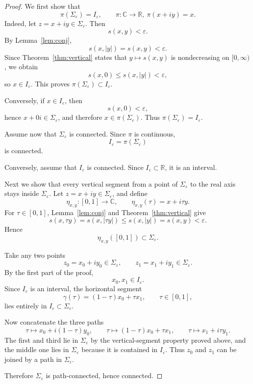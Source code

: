 \documentclass[11pt]{article}
\numberwithin{equation}{section}
\begin{document}
\begin{proof}
We first show that
\[
\pi(\Sigma_\varepsilon)=I_\varepsilon,
\qquad
\pi:\mathbb C\to\mathbb R,\ \pi(x+iy)=x.
\]
Indeed, let \(z=x+iy\in\Sigma_\varepsilon\).  Then
\[
s(x,y)<\varepsilon.
\]
By Lemma~\ref{lem:conj},
\[
s(x,|y|)=s(x,y)<\varepsilon.
\]
Since Theorem~\ref{thm:vertical} states that \(y\mapsto s(x,y)\) is nondecreasing on
\([0,\infty)\), we obtain
\[
s(x,0)\le s(x,|y|)<\varepsilon,
\]
so \(x\in I_\varepsilon\).  This proves \(\pi(\Sigma_\varepsilon)\subset I_\varepsilon\).

Conversely, if \(x\in I_\varepsilon\), then
\[
s(x,0)<\varepsilon,
\]
hence \(x+0i\in\Sigma_\varepsilon\), and therefore \(x\in\pi(\Sigma_\varepsilon)\).
Thus \(\pi(\Sigma_\varepsilon)=I_\varepsilon\).

Assume now that \(\Sigma_\varepsilon\) is connected.  Since \(\pi\) is continuous,
\[
I_\varepsilon=\pi(\Sigma_\varepsilon)
\]
is connected.

Conversely, assume that \(I_\varepsilon\) is connected.  Since \(I_\varepsilon\subset\mathbb R\),
it is an interval.

Next we show that every vertical segment from a point of \(\Sigma_\varepsilon\) to the
real axis stays inside \(\Sigma_\varepsilon\).  Let \(z=x+iy\in\Sigma_\varepsilon\), and define
\[
\eta_{x,y}:[0,1]\to\mathbb C,
\qquad
\eta_{x,y}(\tau)=x+i\tau y.
\]
For \(\tau\in[0,1]\), Lemma~\ref{lem:conj} and Theorem~\ref{thm:vertical} give
\[
s(x,\tau y)=s(x,|\tau y|)
\le s(x,|y|)
= s(x,y)
<\varepsilon.
\]
Hence
\[
\eta_{x,y}([0,1])\subset\Sigma_\varepsilon.
\]

Take any two points
\[
z_0=x_0+iy_0\in\Sigma_\varepsilon,
\qquad
z_1=x_1+iy_1\in\Sigma_\varepsilon.
\]
By the first part of the proof,
\[
x_0,x_1\in I_\varepsilon.
\]
Since \(I_\varepsilon\) is an interval, the horizontal segment
\[
\gamma(\tau)=(1-\tau)x_0+\tau x_1,
\qquad
\tau\in[0,1],
\]
lies entirely in \(I_\varepsilon\subset\Sigma_\varepsilon\).

Now concatenate the three paths
\[
\tau\mapsto x_0+i(1-\tau)y_0,
\qquad
\tau\mapsto (1-\tau)x_0+\tau x_1,
\qquad
\tau\mapsto x_1+i\tau y_1.
\]
The first and third lie in \(\Sigma_\varepsilon\) by the vertical-segment property proved
above, and the middle one lies in \(\Sigma_\varepsilon\) because it is contained in
\(I_\varepsilon\).  Thus \(z_0\) and \(z_1\) can be joined by a path in \(\Sigma_\varepsilon\).

Therefore \(\Sigma_\varepsilon\) is path-connected, hence connected.
\end{proof}
\end{document}
